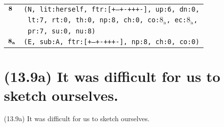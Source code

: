 \documentclass{article}
\begin{document}
\begin{minipage}{\textwidth}
{\begin{tabular}{|r|l|}
    ${\textbf{\textrm{8}}_{\phantom{z}}}$ & \texttt{\texttt{(N,~lit:herself,~ftr:[+--+-+++-],~up:6,~dn:0,}} \\
    & \texttt{\texttt{~lt:7,~rt:0,~th:0,~np:8,~ch:0,~co:${\textrm{8}_{\textrm{a}}}$,~ec:${\textrm{8}_{\textrm{a}}}$,}} \\
    & \texttt{\texttt{~pr:7,~su:0,~nu:8)}} \\
    ${\textbf{\textrm{8}}_{\textbf{\textrm{a}}}}$ & \texttt{\texttt{(E,~sub:A,~ftr:[+--+-+++-],~np:8,~ch:0,~co:0)}} \\
    \hline
  \end{tabular}
  }
\end{minipage}
\bigbreak

\clearpage

%
%

\section*{(13.9a) It was difficult for us to sketch ourselves.}

\bigbreak
\begin{enumerate*}
\item[(13.9a)] It was difficult for us to sketch ourselves.
\end{enumerate*}
\bigbreak
\end{document}
